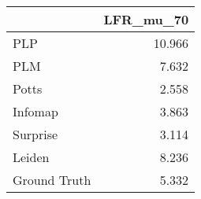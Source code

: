 \begin{tabular}{lr}
\toprule
{} & LFR_mu_70 \\
\midrule
PLP          &    10.966 \\
PLM          &     7.632 \\
Potts        &     2.558 \\
Infomap      &     3.863 \\
Surprise     &     3.114 \\
Leiden       &     8.236 \\
Ground Truth &     5.332 \\
\bottomrule
\end{tabular}

